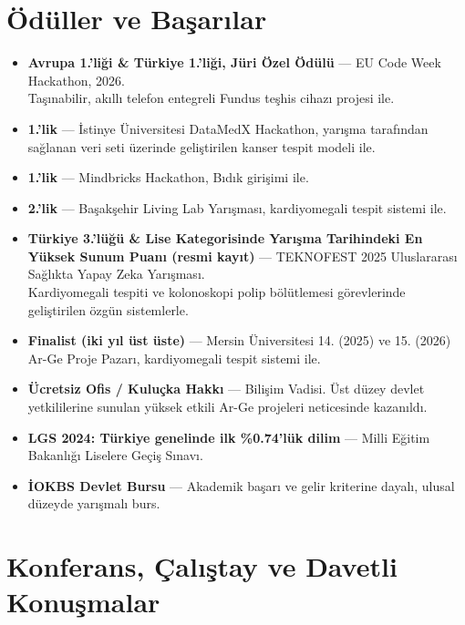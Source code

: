 \documentclass[11pt,a4paper]{article}
\begin{document}
\section*{Ödüller ve Başarılar}
\begin{itemize}
    \item \textbf{Avrupa 1.'liği \& Türkiye 1.'liği, Jüri Özel Ödülü} --- EU Code Week Hackathon, 2026. \\
    Taşınabilir, akıllı telefon entegreli Fundus teşhis cihazı projesi ile.
    \item \textbf{1.'lik} --- İstinye Üniversitesi DataMedX Hackathon, yarışma tarafından sağlanan veri seti üzerinde geliştirilen kanser tespit modeli ile.
    \item \textbf{1.'lik} --- Mindbricks Hackathon, Bıdık girişimi ile.
    \item \textbf{2.'lik} --- Başakşehir Living Lab Yarışması, kardiyomegali tespit sistemi ile.
    \item \textbf{Türkiye 3.'lüğü \& Lise Kategorisinde Yarışma Tarihindeki En Yüksek Sunum Puanı (resmi kayıt)} --- TEKNOFEST 2025 Uluslararası Sağlıkta Yapay Zeka Yarışması. \\
    Kardiyomegali tespiti ve kolonoskopi polip bölütlemesi görevlerinde geliştirilen özgün sistemlerle.
    \item \textbf{Finalist (iki yıl üst üste)} --- Mersin Üniversitesi 14. (2025) ve 15. (2026) Ar-Ge Proje Pazarı, kardiyomegali tespit sistemi ile.
    \item \textbf{Ücretsiz Ofis / Kuluçka Hakkı} --- Bilişim Vadisi. Üst düzey devlet yetkililerine sunulan yüksek etkili Ar-Ge projeleri neticesinde kazanıldı.
    \item \textbf{LGS 2024: Türkiye genelinde ilk \%0.74'lük dilim} --- Milli Eğitim Bakanlığı Liselere Geçiş Sınavı.
    \item \textbf{İOKBS Devlet Bursu} --- Akademik başarı ve gelir kriterine dayalı, ulusal düzeyde yarışmalı burs.
\end{itemize}

\section*{Konferans, Çalıştay ve Davetli Konuşmalar}
\end{document}
